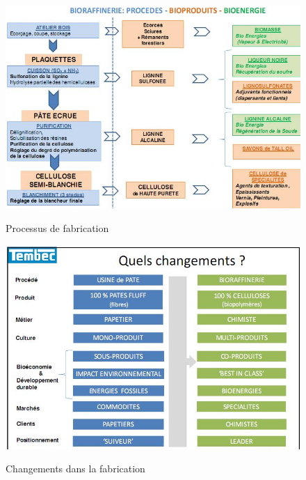 \begin{figure}
	\begin{center}
		\includegraphics[width=0.8\linewidth]{img/processus.png}
		\caption{Processus de fabrication}
		\label{fig:processus}
		\vspace{2cm}
		\includegraphics[width=0.8\linewidth]{img/changements.png}
		\caption{Changements dans la fabrication}
		\label{fig:changements}
	\end{center}
\end{figure}

